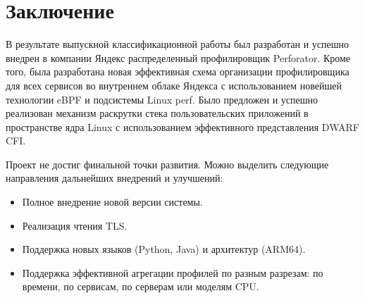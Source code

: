 \section{Заключение}
В результате выпускной классификационной работы был разработан и успешно внедрен в компании Яндекс распределенный профилировщик Perforator.
Кроме того, была разработана новая эффективная схема организации профилировщика для всех сервисов во внутреннем облаке Яндекса
с использованием новейшей технологии eBPF и подсистемы Linux perf.
Было предложен и успешно реализован механизм раскрутки стека пользовательских приложений в пространстве ядра Linux
с использованием эффективного представления DWARF CFI.

Проект не достиг финальной точки развития.
Можно выделить следующие направления дальнейших внедрений и улучшений:
\begin{itemize}
    \item Полное внедрение новой версии системы.
    \item Реализация чтения TLS.
    \item Поддержка новых языков (Python, Java) и архитектур (ARM64).
    \item Поддержка эффективной агрегации профилей по разным разрезам: по времени, по сервисам, по серверам или моделям CPU.
\end{itemize}
